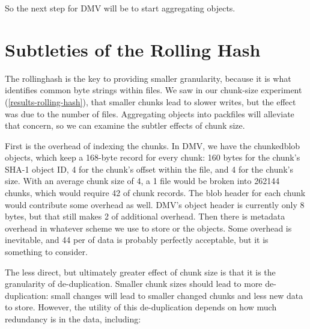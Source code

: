 So the next step for \gls{DMV} will be to start aggregating objects.

%


\section{Subtleties of the Rolling Hash}

The \gls{rollinghash} is the key to providing smaller granularity, because it is
what identifies common byte strings within files. We saw in our chunk-size
experiment (\autoref{results-rolling-hash}), that smaller chunks lead to slower
writes, but the effect was due to the number of files. Aggregating objects into
\glspl{packfile} will alleviate that concern, so we can examine the subtler
effects of chunk size.

First is the overhead of indexing the chunks. In DMV, we have the
\gls{chunkedblob} objects, which keep a \num{168}-byte record for every chunk:
\num{160} bytes for the chunk's SHA-1 object ID, \num{4} for the chunk's offset
within the file, and \num{4} for the chunk's size\footnotemark. With an average
chunk size of \SI{4}{\kib}, a \SI{1}{\gib} file would be broken into
\num{262144} chunks, which would require \SI{42}{\mib} of chunk records. The
blob header for each chunk would contribute some overhead as well. DMV's object
header is currently only \num{8} bytes, but that still makes \SI{2}{\mib} of
additional overhead. Then there is metadata overhead in whatever scheme we use
to store or  the objects. Some overhead is inevitable,
and \SI{44}{\mib} per \si{\gib} of data is probably perfectly acceptable, but it
is something to consider.


The less direct, but ultimately greater effect of chunk size is that it is the
granularity of de-duplication. Smaller chunk sizes should lead to more
de-duplication: small changes will lead to smaller changed chunks and less new
data to store. However, the utility of this de-duplication depends on how much
redundancy is in the data, including:

